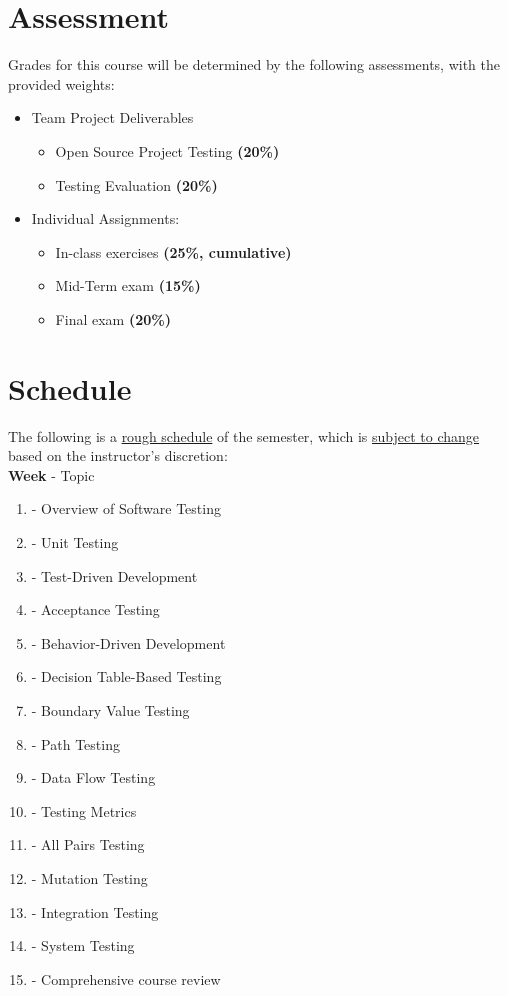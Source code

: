 \documentclass[12pt]{article}
\begin{document}
  \section*{Assessment}
  \noindent
  Grades for this course will be determined by the following assessments, with the provided weights:
  \begin{itemize}
    \item Team Project Deliverables \hfill \\
      \begin{itemize}
        \item Open Source Project Testing \textbf{(20\%)}
        \item Testing Evaluation \textbf{(20\%)}
      \end{itemize}
    \item Individual Assignments: \hfill \\
      \begin{itemize}
        \item In-class exercises \textbf{(25\%, cumulative)}
        \item Mid-Term exam \textbf{(15\%)}
        \item Final exam \textbf{(20\%)}
      \end{itemize}
  \end{itemize}
  
  \section*{Schedule}
  \noindent
  The following is a \underline{rough schedule} of the semester, which is \underline{subject to change} based on the instructor's discretion: \\
  \newline
  \textbf{Week} - Topic 
  \begin{enumerate}
    \item - Overview of Software Testing
    \item - Unit Testing
    \item - Test-Driven Development
    \item - Acceptance Testing
    \item - Behavior-Driven Development
    \item - Decision Table-Based Testing
    \item - Boundary Value Testing
    \item - Path Testing
    \item - Data Flow Testing
    \item - Testing Metrics
    \item - All Pairs Testing
    \item - Mutation Testing
    \item - Integration Testing
    \item - System Testing
    \item - Comprehensive course review
  \end{enumerate}
\end{document}
